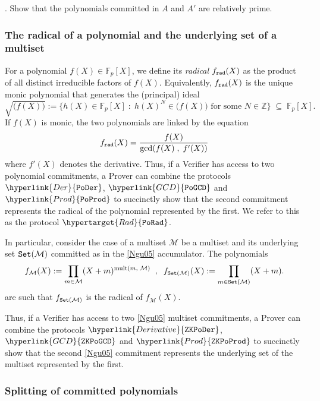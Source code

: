 \documentclass[11pt, lettersize, notitlepage, leqno, footskip=0.6cm]{article}
\newcommand{\bz}{\mathbb Z}
\newcommand{\bFp}{\mathbb{F}_p}
\newcommand{\mc}{\mathcal}
\newcommand{\mr}{\mathrm}
\newcommand{\sub}{\subseteq}
\newcommand{\vs}{\vspace{-0.15cm}}
\newcommand{\noin}{\noindent}
\numberwithin{equation}{section}
\begin{document}
\noin 4. Show that the polynomials committed in $A$ and $A'$ are relatively prime. \vspace{2mm}



\subsubsection{\fontsize{11}{11}\selectfont The radical of a polynomial and the underlying set of a multiset}


For a polynomial $f(X)\in \bFp[X]$, we define its \hypertarget{radical}{\textit{radical}} $f_{\tt{rad}}(X)$ as the product of all distinct irreducible factors of $f(X)$. Equivalently, $f_{\tt{rad}}(X)$ is the unique monic polynomial that generates the (principal) ideal \vs $$ \sqrt{\big(f(X)\big)}:= \big\{h(X)\in \bFp[X]\;:\; h(X)^N\in    \big(f(X)\big)\text{ for some } N\in \bz  \big\}\;\sub\; \bFp[X]. $$ If $f(X)$ is monic, the two polynomials are linked by the equation \vs $$ f_{\tt{rad}}(X) = \frac{f(X)}{\gcd(f(X)\;,\;f'(X))} $$ where $f'(X)$ denotes the derivative. Thus, if a Verifier has access to two polynomial commitments, a Prover can combine the protocols $\hyperlink{Der}{\tt{PoDer}}$, $\hyperlink{GCD}{\tt{PoGCD}}$ and $\hyperlink{Prod}{\tt{PoProd}}$ to succinctly show that the second commitment represents the radical of the polynomial represented by the first. We refer to this as the protocol $\hypertarget{Rad}{\tt{PoRad}}$.

In particular, consider the case of a multiset $\mc{M}$ be a multiset and its underlying set  ${\tt{Set}}(\mc{M})$ committed as in the \hyperlink{Ngu05}{[Ngu05]} accumulator. The polynomials \vs $$f_{\mc{M}}(X):= \prod\limits_{m\in\mc{M}} (X+m)^{\mr{mult}(m,\;\mc{M})}\;\;,\;\;f_{{\tt{Set}}(\mc{M})}(X):= \prod\limits_{m\in {\tt{Set}}(\mc{M})}(X+m) .$$ are such that $f_{{\tt{Set}}(\mc{M})}$ is the radical of $f_{\mc{M}}(X)$.

Thus, if a Verifier has access to two \hyperlink{Ngu05}{[Ngu05]} multiset commitments, a Prover can combine the protocols $\hyperlink{Derivative}{\tt{ZKPoDer}}$, $\hyperlink{GCD}{\tt{ZKPoGCD}}$ and $\hyperlink{Prod}{\tt{ZKPoProd}}$ to succinctly show that the second \hyperlink{Ngu05}{[Ngu05]} commitment represents the underlying set of the multiset represented by the first. 

\subsubsection{\fontsize{11}{11}\selectfont Splitting of committed polynomials}
\end{document}
